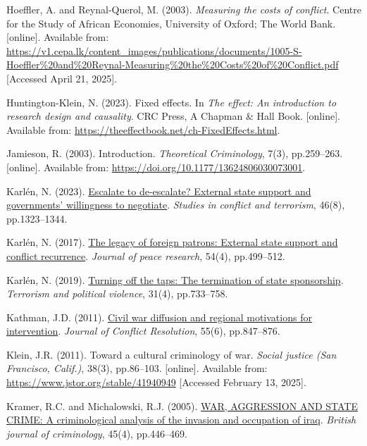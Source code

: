 \documentclass[
]{article}
\newlength{\cslhangindent}
\newenvironment{CSLReferences}[2] %
 {\begin{list}{}{%
  \setlength{\itemindent}{0pt}
  \setlength{\leftmargin}{0pt}
  \setlength{\parsep}{0pt}
  \ifodd #1
   \setlength{\leftmargin}{\cslhangindent}
   \setlength{\itemindent}{-1\cslhangindent}
  \fi
  \setlength{\itemsep}{#2\baselineskip}}}
 {\end{list}}
\begin{document}
\begin{CSLReferences}{0}{1}
Hoeffler, A. and Reynal-Querol, M. (2003). \emph{Measuring the costs of
conflict}. Centre for the Study of African Economies, University of
Oxford; The World Bank. {[}online{]}. Available from:
\url{https://v1.cepa.lk/content_images/publications/documents/1005-S-Hoeffler\%20and\%20Reynal-Measuring\%20the\%20Costs\%20of\%20Conflict.pdf}
{[}Accessed April 21, 2025{]}.

Huntington-Klein, N. (2023). Fixed effects. In \emph{The effect: An
introduction to research design and causality}. CRC Press, A Chapman \&
Hall Book. {[}online{]}. Available from:
\url{https://theeffectbook.net/ch-FixedEffects.html}.

Jamieson, R. (2003). Introduction. \emph{Theoretical Criminology}, 7(3),
pp.259--263. {[}online{]}. Available from:
\url{https://doi.org/10.1177/13624806030073001}.

Karlén, N. (2023).
\href{https://doi.org/10.1080/1057610X.2020.1835002}{Escalate to
de-escalate? External state support and governments' willingness to
negotiate}. \emph{Studies in conflict and terrorism}, 46(8),
pp.1323--1344.

Karlén, N. (2017). \href{https://doi.org/10.1177/0022343317700465}{The
legacy of foreign patrons: External state support and conflict
recurrence}. \emph{Journal of peace research}, 54(4), pp.499--512.

Karlén, N. (2019).
\href{https://doi.org/10.1080/09546553.2017.1282861}{Turning off the
taps: The termination of state sponsorship}. \emph{Terrorism and
political violence}, 31(4), pp.733--758.

Kathman, J.D. (2011).
\href{https://doi.org/10.1177/0022002711408009}{Civil war diffusion and
regional motivations for intervention}. \emph{Journal of Conflict
Resolution}, 55(6), pp.847--876.

Klein, J.R. (2011). Toward a cultural criminology of war. \emph{Social
justice (San Francisco, Calif.)}, 38(3), pp.86--103. {[}online{]}.
Available from: \url{https://www.jstor.org/stable/41940949} {[}Accessed
February 13, 2025{]}.

Kramer, R.C. and Michalowski, R.J. (2005).
\href{https://doi.org/10.1093/bjc/azi032}{WAR, AGGRESSION AND STATE
CRIME: A criminological analysis of the invasion and occupation of
iraq}. \emph{British journal of criminology}, 45(4), pp.446--469.


\end{CSLReferences}
\end{document}
